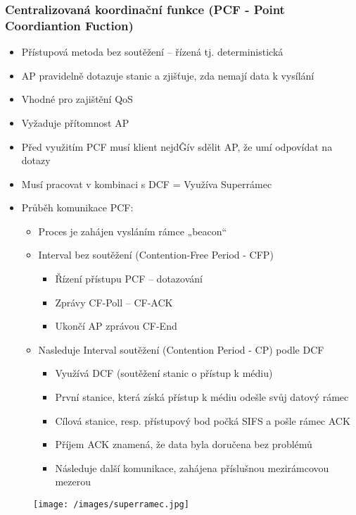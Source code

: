 \subsubsection{Centralizovaná koordinační funkce (PCF - Point Coordiantion Fuction) }
\begin{itemize}
    \item Přístupová metoda bez soutěžení – řízená tj. deterministická
    \item AP pravidelně dotazuje stanic a zjišťuje, zda nemají data k vysílání
    \item Vhodné pro zajištění QoS
    \item Vyžaduje přítomnost AP
    \item Před využitím PCF musí klient nejdĜív sdělit AP, že umí odpovídat na dotazy
    \item Musí pracovat v kombinaci s DCF = Využíva Superrámec
    \item Průběh komunikace PCF:
    \begin{itemize}
    \item Proces je zahájen vysláním rámce „beacon“ 
    \item Interval bez soutěžení (Contention-Free Period - CFP)
    \begin{itemize}
    \item Řízení přístupu PCF – dotazování
    \item Zprávy CF-Poll – CF-ACK
    \item Ukončí AP zprávou CF-End
    \end{itemize}
    \item Nasleduje Interval soutěžení (Contention Period - CP) podle DCF 
     \begin{itemize}
     \item Využívá DCF (soutěžení stanic o přístup k médiu)
     \item První stanice, která získá přístup k médiu odešle svůj datový rámec
     \item Cílová stanice, resp. přístupový bod počká SIFS a pošle rámec ACK
     \item Příjem ACK znamená, že data byla doručena bez problémů
     \item Následuje další komunikace, zahájena příslušnou mezirámcovou mezerou
     \end{itemize}
    \end{itemize}
\end{itemize}
\begin{figure}[ht]
\centering
  \begin{center}
    \texttt{[image: /images/superramec.jpg]}
  \end{center}
\end{figure}


